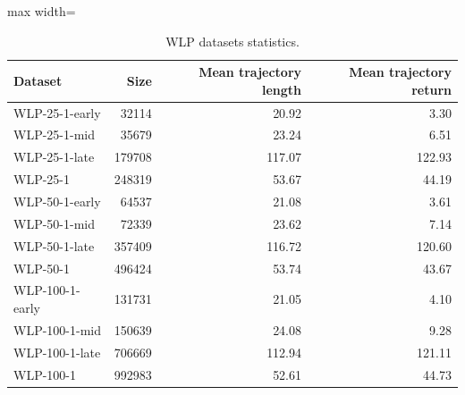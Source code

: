 \documentclass{article}
\begin{document}
\begin{table}[ht]
    \label{tab:wlp_stats}
    \begin{center}
        \caption{WLP datasets statistics.}
    \begin{small}
    \begin{adjustbox}{max width=\columnwidth}
		\begin{tabular}{l|rrr}
		\toprule
	\textbf{Dataset} & \textbf{Size} & \textbf{Mean trajectory length} & \textbf{Mean trajectory return}\\
\midrule
WLP-25-1-early & 32114 & 20.92 & 3.30\\
WLP-25-1-mid & 35679 & 23.24 & 6.51\\
WLP-25-1-late & 179708 & 117.07 & 122.93\\
WLP-25-1 & 248319 & 53.67 & 44.19\\
\midrule
WLP-50-1-early & 64537 & 21.08 & 3.61\\
WLP-50-1-mid & 72339 & 23.62 & 7.14\\
WLP-50-1-late & 357409 & 116.72 & 120.60\\
WLP-50-1 & 496424 & 53.74 & 43.67\\
\midrule
WLP-100-1-early & 131731 & 21.05 & 4.10\\
WLP-100-1-mid & 150639 & 24.08 & 9.28\\
WLP-100-1-late & 706669 & 112.94 & 121.11\\
WLP-100-1 & 992983 & 52.61 & 44.73\\
\bottomrule
\end{tabular}
        \end{adjustbox}
    \end{small}
    \end{center}
    \vskip -0.1in
\end{table}
\FloatBarrier
\end{document}

